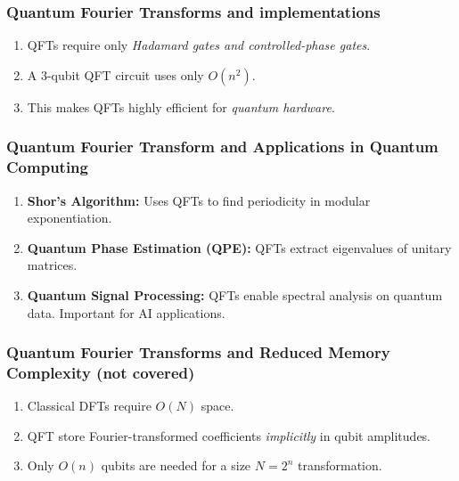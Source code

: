 \documentclass[aspectratio=169]{beamer}
\begin{document}
\begin{frame}
\frametitle{Quantum Fourier Transforms and implementations}

\begin{enumerate}
\item QFTs require only \emph{Hadamard gates and controlled-phase gates}.

\item A 3-qubit QFT circuit uses only $O(n^2)$.

\item This makes QFTs highly efficient for \emph{quantum hardware}.
\end{enumerate}

\noindent
\end{frame}

\begin{frame}
\frametitle{Quantum Fourier Transform and Applications in Quantum Computing}

\begin{enumerate}
\item \textbf{Shor’s Algorithm:} Uses QFTs to find periodicity in modular exponentiation.

\item \textbf{Quantum Phase Estimation (QPE):} QFTs extract eigenvalues of unitary matrices.

\item \textbf{Quantum Signal Processing:} QFTs enable spectral analysis on quantum data. Important for AI applications.
\end{enumerate}

\noindent
\end{frame}

\begin{frame}
\frametitle{Quantum Fourier Transforms and Reduced Memory Complexity (not covered)}

\begin{enumerate}
\item Classical DFTs require $O(N)$ space.

\item QFT store Fourier-transformed coefficients \emph{implicitly} in qubit amplitudes.

\item Only $O(n)$ qubits are needed for a size $N = 2^n$ transformation.
\end{enumerate}

\noindent
\end{frame}
\end{document}
